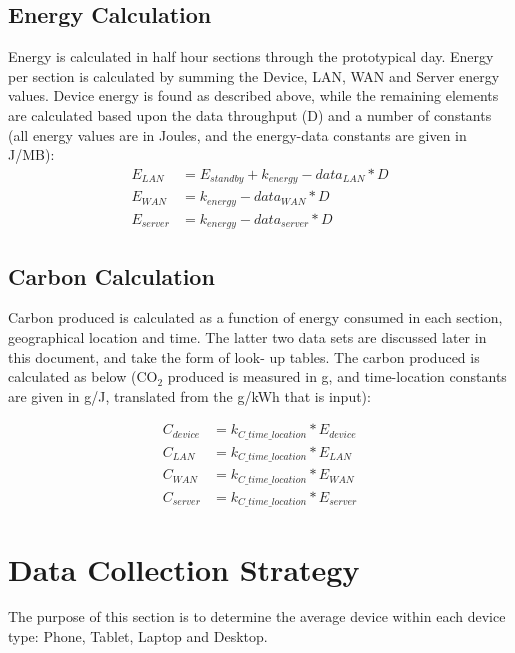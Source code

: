 \documentclass[conference]{IEEEtran}
\begin{document}
\subsection{Energy Calculation}

Energy is calculated in half hour sections through the prototypical
day. Energy per section is calculated by summing the Device, LAN, WAN
and Server energy values. Device energy is found as described above,
while the remaining elements are calculated based upon the data
throughput (D) and a number of constants (all energy values are in
Joules, and the energy-data constants are given in J/MB):
\begin{align*}
E_{LAN} &= E_{standby} + k_{energy}-data_{LAN} * D\\
E_{WAN} &= k_{energy}-data_{WAN} * D\\
E_{server} &= k_{energy}-data_{server} * D
\end{align*}

\subsection{Carbon Calculation}

Carbon produced is calculated as a function of energy consumed in each
section, geographical location and time. The latter two data sets are
discussed later in this document, and take the form of look- up
tables. The carbon produced is calculated as below (CO$_2$ produced is
measured in g, and time-location constants are given in g/J,
translated from the g/kWh that is input):

\begin{align*}
C_{device} &= k_{C\_time\_location} * E_{device}\\
C_{LAN} &= k_{C\_time\_location} * E_{LAN}\\
C_{WAN} &= k_{C\_time\_location} * E_{WAN}\\
C_{server} &= k_{C\_time\_location} * E_{server}
\end{align*}

\section{Data Collection Strategy}


The purpose of this section is to determine the average device within
each device type: Phone, Tablet, Laptop and Desktop.
\end{document}
